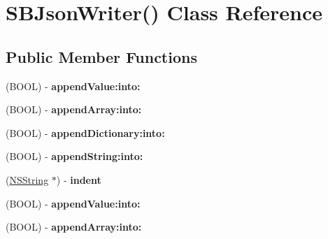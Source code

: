 \hypertarget{interface_s_b_json_writer_07_08}{
\section{\-S\-B\-Json\-Writer() \-Class \-Reference}
\label{interface_s_b_json_writer_07_08}
}
\subsection*{\-Public \-Member \-Functions}
\begin{DoxyCompactItemize}
\item 
\hypertarget{interface_s_b_json_writer_07_08_a4364dcbbe231d0fcd36e12efaf107f51}{
(\-B\-O\-O\-L) -\/ {\bfseries append\-Value\-:into\-:}}
\label{interface_s_b_json_writer_07_08_a4364dcbbe231d0fcd36e12efaf107f51}

\item 
\hypertarget{interface_s_b_json_writer_07_08_a5d28358c936d8c3325add8b9cf9c11f2}{
(\-B\-O\-O\-L) -\/ {\bfseries append\-Array\-:into\-:}}
\label{interface_s_b_json_writer_07_08_a5d28358c936d8c3325add8b9cf9c11f2}

\item 
\hypertarget{interface_s_b_json_writer_07_08_ae7b697af01ff6197a5bf1f1cc5eba887}{
(\-B\-O\-O\-L) -\/ {\bfseries append\-Dictionary\-:into\-:}}
\label{interface_s_b_json_writer_07_08_ae7b697af01ff6197a5bf1f1cc5eba887}

\item 
\hypertarget{interface_s_b_json_writer_07_08_aa3803962660a20ecec9f100bbd393ff6}{
(\-B\-O\-O\-L) -\/ {\bfseries append\-String\-:into\-:}}
\label{interface_s_b_json_writer_07_08_aa3803962660a20ecec9f100bbd393ff6}

\item 
\hypertarget{interface_s_b_json_writer_07_08_aff5108b4c65eb132d710db30ca1a3d03}{
(\hyperlink{class_n_s_string}{\-N\-S\-String} $\ast$) -\/ {\bfseries indent}}
\label{interface_s_b_json_writer_07_08_aff5108b4c65eb132d710db30ca1a3d03}

\item 
\hypertarget{interface_s_b_json_writer_07_08_a4364dcbbe231d0fcd36e12efaf107f51}{
(\-B\-O\-O\-L) -\/ {\bfseries append\-Value\-:into\-:}}
\label{interface_s_b_json_writer_07_08_a4364dcbbe231d0fcd36e12efaf107f51}

\item 
\hypertarget{interface_s_b_json_writer_07_08_a5d28358c936d8c3325add8b9cf9c11f2}{
(\-B\-O\-O\-L) -\/ {\bfseries append\-Array\-:into\-:}}
\label{interface_s_b_json_writer_07_08_a5d28358c936d8c3325add8b9cf9c11f2}


\end{DoxyCompactItemize}
